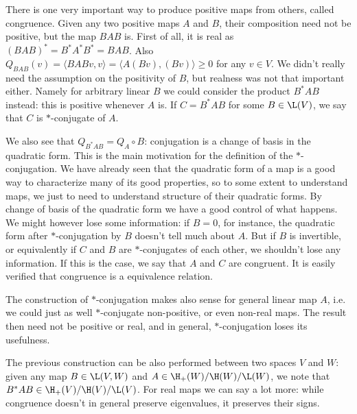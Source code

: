 There is one very important way to produce positive maps from others, called congruence. Given any two positive maps $A$ and $B$, their composition need not be positive, but the map $BAB$ is. First of all, it is real as $(BAB)^{*} = B^{*} A^{*} B^{*} = BAB$. Also $Q_{BAB}(v) = \langle BAB v, v \rangle = \langle A (B v), (B v) \rangle \geq 0$ for any $v \in V$. We didn't really need the assumption on the positivity of $B$, but realness was not that important either. Namely for arbitrary linear $B$ we could consider the product $B^{*}AB$ instead: this is positive whenever $A$ is. If $C = B^{*}AB$ for some $B \in \L(V)$, we say that $C$ is $*$-conjugate of $A$.

We also see that $Q_{B^{*}AB} = Q_{A} \circ B$: conjugation is a change of basis in the quadratic form. This is the main motivation for the definition of the $*$-conjugation. We have already seen that the quadratic form of a map is a good way to characterize many of its good properties, so to some extent to understand maps, we just to need to understand structure of their quadratic forms. By change of basis of the quadratic form we have a good control of what happens. We might however lose some information: if $B = 0$, for instance, the quadratic form after $*$-conjugation by $B$ doesn't tell much about $A$. But if $B$ is invertible, or equivalently if $C$ and $B$ are $*$-conjugates of each other, we shouldn't lose any information. If this is the case, we say that $A$ and $C$ are congruent. It is easily verified that congruence is a equivalence relation.

The construction of $*$-conjugation makes also sense for general linear map $A$, i.e. we could just as well $*$-conjugate non-positive, or even non-real maps. The result then need not be positive or real, and in general, $*$-conjugation loses its usefulness.

The previous construction can be also performed between two spaces $V$ and $W$: given any map $B \in \L(V, W)$ and $A \in \H_{+}(W)/\H(W)/\L(W)$, we note that $B^{*}AB \in \H_{+}(V)/\H(V)/\L(V)$. For real maps we can say a lot more: while congruence doesn't in general preserve eigenvalues, it preserves their signs.


